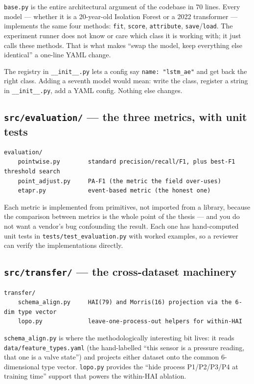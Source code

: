\documentclass[11pt,a4paper]{article}
\newcommand{\code}[1]{\texttt{#1}}
\begin{document}
\code{base.py} is the entire architectural argument of the codebase in 70 lines. Every model --- whether it is a 20-year-old Isolation Forest or a 2022 transformer --- implements the same four methods: \code{fit}, \code{score}, \code{attribute}, \code{save}/\code{load}. The experiment runner does not know or care which class it is working with; it just calls these methods. That is what makes ``swap the model, keep everything else identical'' a one-line YAML change.

The registry in \code{\_\_init\_\_.py} lets a config say \code{name: "lstm\_ae"} and get back the right class. Adding a seventh model would mean: write the class, register a string in \code{\_\_init\_\_.py}, add a YAML config. Nothing else changes.

\subsection{\texttt{src/evaluation/} --- the three metrics, with unit tests}

\begin{Verbatim}
evaluation/
    pointwise.py        standard precision/recall/F1, plus best-F1 threshold search
    point_adjust.py     PA-F1 (the metric the field over-uses)
    etapr.py            event-based metric (the honest one)
\end{Verbatim}

Each metric is implemented from primitives, not imported from a library, because the comparison between metrics is the whole point of the thesis --- and you do not want a vendor's bug confounding the result. Each one has hand-computed unit tests in \code{tests/test\_evaluation.py} with worked examples, so a reviewer can verify the implementations directly.

\subsection{\texttt{src/transfer/} --- the cross-dataset machinery}

\begin{Verbatim}
transfer/
    schema_align.py     HAI(79) and Morris(16) projection via the 6-dim type vector
    lopo.py             leave-one-process-out helpers for within-HAI
\end{Verbatim}

\code{schema\_align.py} is where the methodologically interesting bit lives: it reads \code{data/feature\_types.yaml} (the hand-labelled ``this sensor is a pressure reading, that one is a valve state'') and projects either dataset onto the common 6-dimensional type vector. \code{lopo.py} provides the ``hide process P1/P2/P3/P4 at training time'' support that powers the within-HAI ablation.
\end{document}
